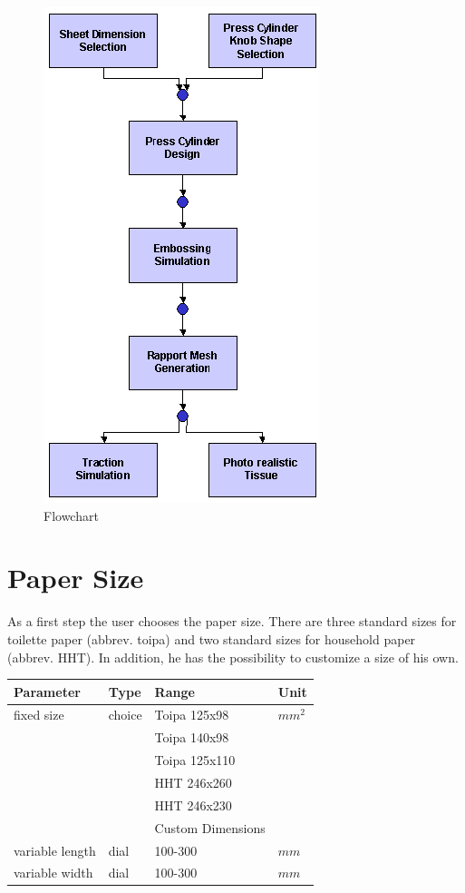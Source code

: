 \begin{figure}[!Hhtp]
  \begin{center}
   \includegraphics[scale=0.6]{process/flowchart_overview}
   \caption{Flowchart}
  \end{center}
\end{figure}

\section{Paper Size}

As a first step the user chooses the  paper size. There are three standard sizes for 
toilette paper (abbrev. toipa) and two standard sizes for household 
paper (abbrev. HHT). In addition, he has the possibility to customize 
a size of his own.

\vspace{0.5cm}
\begin{tabular}{|l|l|l|l|} \hline
Parameter 		& Type 		& Range 	& Unit	\\ \hline
fixed size 	& choice 	& Toipa 125x98	& $mm^2$ 	\\ 
				& 		 	& Toipa 140x98	&			\\
				& 		 	& Toipa 125x110	&			\\				
				& 			& HHT 246x260	& 			\\ 
			     	&			& HHT 246x230	& 			\\ 
				& 			& Custom Dimensions		& 			\\ \hline
variable length	& dial	& 100-300 		& $mm$ 		\\ \hline
variable width & dial	& 100-300 		& $mm$ 		\\ \hline
\end{tabular}
\vspace{0.5cm}

